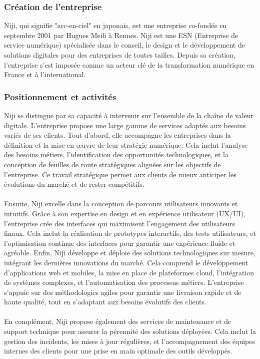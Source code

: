 \documentclass[12pt]{article}
\begin{document}
\subsubsection{Création de l'entreprise}
Niji, qui signifie "arc-en-ciel" en japonais, est une entreprise co-fondée en septembre 2001 par Hugues Meili à Rennes. Niji est une ESN (Entreprise de service numérique) spécialisée dans le conseil, le design et le développement de solutions digitales pour des entreprises de toutes tailles. Depuis sa création, l'entreprise s'est imposée comme un acteur clé de la transformation numérique en France et à l'international.
\subsubsection{Positionnement et activités}
Niji se distingue par sa capacité à intervenir sur l'ensemble de la chaîne de valeur digitale. L'entreprise propose une large gamme de services adaptés aux besoins variés de ses clients. 
Tout d'abord, elle accompagne les entreprises dans la définition et la mise en œuvre de leur stratégie numérique. Cela inclut l'analyse des besoins métiers, l'identification des opportunités technologiques, et la conception de feuilles de route stratégiques alignées sur les objectifs de l'entreprise. Ce travail stratégique permet aux clients de mieux anticiper les évolutions du marché et de rester compétitifs.
\\\\
Ensuite, Niji excelle dans la conception de parcours utilisateurs innovants et intuitifs. Grâce à son expertise en design et en expérience utilisateur (UX/UI), l'entreprise crée des interfaces qui maximisent l'engagement des utilisateurs finaux. Cela inclut la réalisation de prototypes interactifs, des tests utilisateurs, et l'optimisation continue des interfaces pour garantir une expérience fluide et agréable.
\newpage
\noindent
Enfin, Niji développe et déploie des solutions technologiques sur mesure, intégrant les dernières innovations du marché. Cela comprend le développement d'applications web et mobiles, la mise en place de plateformes cloud, l'intégration de systèmes complexes, et l'automatisation des processus métiers. L'entreprise s'appuie sur des méthodologies agiles pour garantir une livraison rapide et de haute qualité, tout en s'adaptant aux besoins évolutifs des clients.
\\\\
En complément, Niji propose également des services de maintenance et de support technique pour assurer la pérennité des solutions déployées. Cela inclut la gestion des incidents, les mises à jour régulières, et l'accompagnement des équipes internes des clients pour une prise en main optimale des outils développés.
\end{document}
